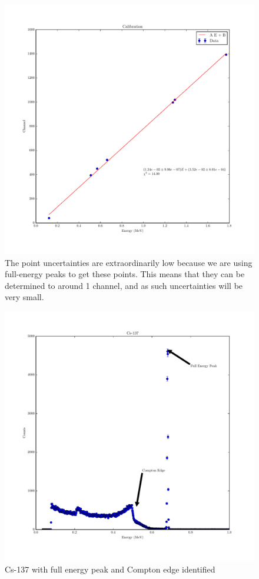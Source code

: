 \documentclass[reprint, nobibnotes, amssymb, amsmath, amsfonts, physics, mathtools, mathrsfs, floatfix]{revtex4-1}
\begin{document}
    \begin{widetext}

      \begin{figure}[h]
        \centering
        \includegraphics[width=\linewidth]{../plots/calibration.pdf}
        \caption{The point uncertainties are extraordinarily low because we are using full-energy peaks to get these points.  This means that they can be determined to around 1 channel, and as such uncertainties will be very small. \label{fig:calibration}}
      \end{figure}

      \begin{figure}[h]
        \centering
        \includegraphics[width=\linewidth]{../plots/Cs-137.pdf}
        \caption{Cs-137 with full energy peak and Compton edge identified \label{fig:cs}}
      \end{figure}


\end{widetext}
\end{document}
